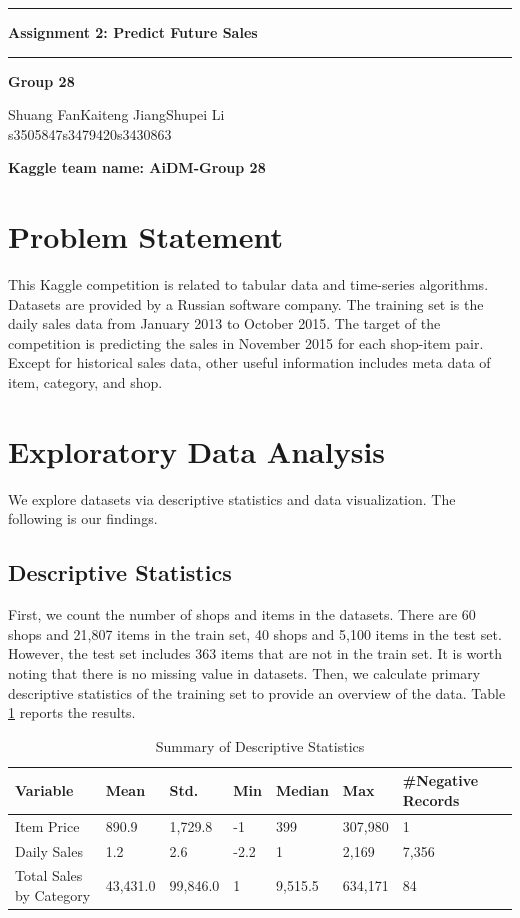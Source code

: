 \documentclass{article}
\begin{document}
\noindent\rule{\textwidth}{1pt}
\begin{center}
    \LARGE \textbf{Assignment 2: Predict Future Sales}
\end{center}
\noindent\rule{\textwidth}{0.5pt}
\begin{center}
    \textbf{Group 28}\par
    \vspace{0.3cm}
Shuang Fan\phantom{space}Kaiteng Jiang\phantom{space}Shupei Li\\
s3505847\phantom{spacespac}s3479420\phantom{spacespa}s3430863
\end{center}
    \vspace{0.2cm}
\textbf{Kaggle team name: AiDM-Group 28}

\section{Problem Statement}
This Kaggle competition is related to tabular data and time-series algorithms. Datasets are provided by a Russian software company. The training set is the daily sales data from January 2013 to October 2015. The target of the competition is predicting the sales in November 2015 for each shop-item pair. Except for historical sales data, other useful information includes meta data of item, category, and shop.

\section{Exploratory Data Analysis}
We explore datasets via descriptive statistics and data visualization. The following is our findings.

\subsection{Descriptive Statistics}\label{stat}
First, we count the number of shops and items in the datasets. There are 60 shops and 21,807 items in the train set, 40 shops and 5,100 items in the test set. However, the test set includes 363 items that are not in the train set. It is worth noting that there is no missing value in datasets. Then, we calculate primary descriptive statistics of the training set to provide an overview of the data. Table \ref{tab:de-stat} reports the results.

\begin{table}[!ht]
    \centering
    \caption{Summary of Descriptive Statistics}
    \label{tab:de-stat}
    \begin{tabular}{llllllll}
        \toprule
        \textbf{Variable} & \textbf{Mean} & \textbf{Std.} & \textbf{Min} & \textbf{Median} & \textbf{Max} & \textbf{\#Negative Records}\\
        \midrule
        Item Price & 890.9 & 1,729.8 & -1 & 399 & 307,980 & 1\\
        Daily Sales & 1.2 & 2.6 & -2.2 & 1 & 2,169 & 7,356\\
        Total Sales by Category & 43,431.0 & 99,846.0 & 1 & 9,515.5 & 634,171 & 84\\
        \bottomrule
    \end{tabular}
\end{table}
\end{document}
